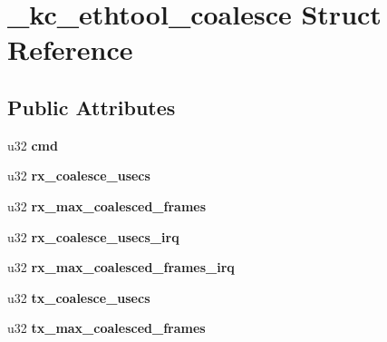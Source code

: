 \hypertarget{struct__kc__ethtool__coalesce}{
\section{\_\-kc\_\-ethtool\_\-coalesce Struct Reference}
\label{struct__kc__ethtool__coalesce}
}
\subsection*{Public Attributes}
\begin{DoxyCompactItemize}
\item 
\hypertarget{struct__kc__ethtool__coalesce_a5919590034ad31d7398eb044af2da351}{
u32 {\bfseries cmd}}
\label{struct__kc__ethtool__coalesce_a5919590034ad31d7398eb044af2da351}

\item 
\hypertarget{struct__kc__ethtool__coalesce_a7f714ef315c64dfa84d2cf15d4e5a2d4}{
u32 {\bfseries rx\_\-coalesce\_\-usecs}}
\label{struct__kc__ethtool__coalesce_a7f714ef315c64dfa84d2cf15d4e5a2d4}

\item 
\hypertarget{struct__kc__ethtool__coalesce_a735429b6781230b9ca1e67f511ef548e}{
u32 {\bfseries rx\_\-max\_\-coalesced\_\-frames}}
\label{struct__kc__ethtool__coalesce_a735429b6781230b9ca1e67f511ef548e}

\item 
\hypertarget{struct__kc__ethtool__coalesce_a65452df21c0d459fd0ffbdc3acbf05b1}{
u32 {\bfseries rx\_\-coalesce\_\-usecs\_\-irq}}
\label{struct__kc__ethtool__coalesce_a65452df21c0d459fd0ffbdc3acbf05b1}

\item 
\hypertarget{struct__kc__ethtool__coalesce_a0eb8b6ef0b1b37499b69adea31ee6c14}{
u32 {\bfseries rx\_\-max\_\-coalesced\_\-frames\_\-irq}}
\label{struct__kc__ethtool__coalesce_a0eb8b6ef0b1b37499b69adea31ee6c14}

\item 
\hypertarget{struct__kc__ethtool__coalesce_a04947f71039d7c9017fc1931f90f7aec}{
u32 {\bfseries tx\_\-coalesce\_\-usecs}}
\label{struct__kc__ethtool__coalesce_a04947f71039d7c9017fc1931f90f7aec}

\item 
\hypertarget{struct__kc__ethtool__coalesce_a0d78a5e520007f6d4b2a90aa38d7a8ed}{
u32 {\bfseries tx\_\-max\_\-coalesced\_\-frames}}
\label{struct__kc__ethtool__coalesce_a0d78a5e520007f6d4b2a90aa38d7a8ed}


\end{DoxyCompactItemize}
